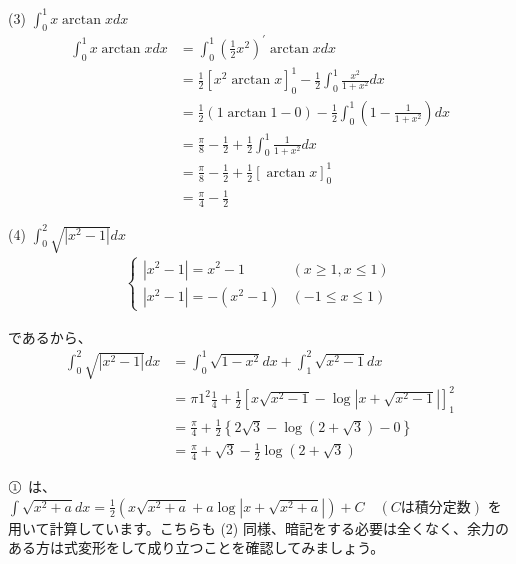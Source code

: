 \documentclass[a4j]{jsarticle}
\newcommand{\ctext}[1]{\raise0.2ex\hbox{\textcircled{\scriptsize{#1}}}} %
\begin{document}
    (3) $\displaystyle \int_{0}^{1} x \arctan x dx$ \\

    \begin{align*}
        \int_{0}^{1} x \arctan x dx &= \int_{0}^{1} \left(\frac{1}{2}x^2\right)^{\prime} \arctan xdx \\
        &= \frac{1}{2} \left[x^2 \arctan x\right]_{0}^{1} - \frac{1}{2} \int_{0}^{1} \frac{x^2}{1 + x^2} dx \\
        &= \frac{1}{2} (1 \arctan1 - 0) - \frac{1}{2} \int_{0}^{1} \left(1 - \frac{1}{1 + x^2}\right)dx \\
        &= \frac{\pi}{8} - \frac{1}{2} + \frac{1}{2} \int_{0}^{1} \frac{1}{1 + x^2} dx \\
        &= \frac{\pi}{8} - \frac{1}{2} + \frac{1}{2} \left[\arctan x\right]_{0}^{1} \\
        &= \frac{\pi}{4} - \frac{1}{2}
    \end{align*}

    (4) $\displaystyle \int_{0}^{2} \sqrt{|x^2 - 1|} dx$ \\

    \begin{align*}
        \begin{cases}
          |x^2 - 1| = x^2 - 1 & (x \geq 1, x \leq 1) \\
          |x^2 - 1| = - (x^2 - 1) & (-1 \leq x \leq 1)
        \end{cases}
    \end{align*}
    
    であるから、
    \begin{align*}
        \int_{0}^{2} \sqrt{|x^2 - 1|} dx &= \int_{0}^{1} \sqrt{1 - x^2} dx + \int_{1}^{2} \sqrt{x^2 - 1} dx \\
        &= \pi 1^2 \frac{1}{4} + \frac{1}{2} \left[x\sqrt{x^2 - 1} - \log \left|x + \sqrt{x^2 - 1}\right|\right]_{1}^{2} \\
        &= \frac{\pi}{4} + \frac{1}{2} \left\{2\sqrt{3} - \log(2 + \sqrt{3}) - 0\right\} \\
        &= \frac{\pi}{4} + \sqrt{3} - \frac{1}{2} \log (2 + \sqrt{3})
    \end{align*}

    \begin{screen}
        $\ctext{1}$ は、$ \displaystyle \int \sqrt{x^2 + a} dx = \frac{1}{2} (x\sqrt{x^2 + a} + a\log \left|x + \sqrt{x^2 + a}\right|) + C \quad (C は積分定数)$
        を用いて計算しています。こちらも (2) 同様、暗記をする必要は全くなく、余力のある方は式変形をして成り立つことを確認してみましょう。
    \end{screen}
    \\
\end{document}
